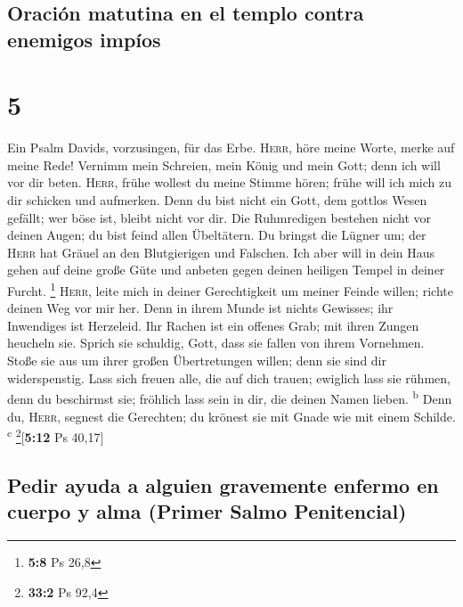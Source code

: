 \hypertarget{oraciuxf3n-matutina-en-el-templo-contra-enemigos-impuxedos}{%
\subsection{Oración matutina en el templo contra enemigos
impíos}\label{oraciuxf3n-matutina-en-el-templo-contra-enemigos-impuxedos}}

\hypertarget{section-4}{%
\section{5}\label{section-4}}

 Ein Psalm Davids, vorzusingen, für das Erbe.
 \textsc{Herr}, höre meine Worte, merke auf meine Rede!
 Vernimm mein Schreien, mein König und mein Gott; denn ich
will vor dir beten.  \textsc{Herr}, frühe wollest du meine
Stimme hören; frühe will ich mich zu dir schicken und aufmerken.
 Denn du bist nicht ein Gott, dem gottlos Wesen gefällt;
wer böse ist, bleibt nicht vor dir.  Die Ruhmredigen
bestehen nicht vor deinen Augen; du bist feind allen Übeltätern.
 Du bringst die Lügner um; der \textsc{Herr} hat Gräuel an
den Blutgierigen und Falschen.  Ich aber will in dein Haus
gehen auf deine große Güte und anbeten gegen deinen heiligen Tempel in
deiner Furcht. \footnote{\textbf{5:8} Ps 26,8} 
\textsc{Herr}, leite mich in deiner Gerechtigkeit um meiner Feinde
willen; richte deinen Weg vor mir her.  Denn in ihrem
Munde ist nichts Gewisses; ihr Inwendiges ist Herzeleid. Ihr Rachen ist
ein offenes Grab; mit ihren Zungen heucheln sie.  Sprich
sie schuldig, Gott, dass sie fallen von ihrem Vornehmen. Stoße sie aus
um ihrer großen Übertretungen willen; denn sie sind dir widerspenstig.
 Lass sich freuen alle, die auf dich trauen; ewiglich
lass sie rühmen, denn du beschirmst sie; fröhlich lass sein in dir, die
deinen Namen lieben. \textsuperscript{b}  Denn du,
\textsc{Herr}, segnest die Gerechten; du krönest sie mit Gnade wie mit
einem Schilde. \textsuperscript{c} \footnote{\textbf{33:2} Ps 92,4}{[}\textbf{5:12}
Ps 40,17{]}

\hypertarget{pedir-ayuda-a-alguien-gravemente-enfermo-en-cuerpo-y-alma-primer-salmo-penitencial}{%
\subsection{Pedir ayuda a alguien gravemente enfermo en cuerpo y alma
(Primer Salmo
Penitencial)}\label{pedir-ayuda-a-alguien-gravemente-enfermo-en-cuerpo-y-alma-primer-salmo-penitencial}}


